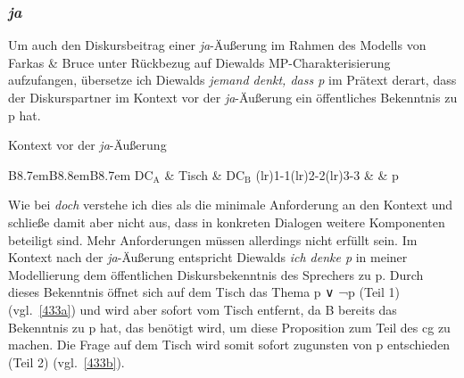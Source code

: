 \subsubsection{\textit{ja}}
\label{sec:ja}
Um auch den Diskursbeitrag einer \textit{ja}-Äußerung im Rahmen des Modells von Farkas \& Bruce unter Rückbezug auf Diewalds MP-Charakterisierung aufzufangen, übersetze ich Diewalds \textit{jemand denkt, dass p} im Prätext derart, dass der Diskurspartner im Kontext vor der \textit{ja}-Äußerung ein öffentliches Bekenntnis zu p hat.
\begin{exe}
	\ex\label{432} Kontext vor der \textit{ja}-Äußerung \\[-1em]	
 		\begin{tabular}[t]{B{8.7em}B{8.8em}B{8.7em}}
\lsptoprule 	
   		$\textrm{DC}_{\textrm{A}}$ & {Tisch} & $\textrm{DC}_{\textrm{B}}$ \tabularnewline\cmidrule(lr){1-1}\cmidrule(lr){2-2}\cmidrule(lr){3-3}
   		{} & {} & p \tabularnewline\midrule      
   		 \tabularnewline   
  		 \lspbottomrule
\end{tabular}
\end{exe}\largerpage[2]
Wie bei \textit{doch} verstehe ich dies als die minimale Anforderung an den Kontext und schließe damit aber nicht aus, dass in konkreten Dialogen weitere Komponenten beteiligt sind. Mehr Anforderungen müssen allerdings nicht erfüllt sein. Im Kontext nach der \textit{ja}-Äußerung entspricht Diewalds \textit{ich denke p} in meiner Mo\-dellierung dem öffentlichen Diskursbekenntnis des Sprechers zu p. Durch dieses Bekenntnis öffnet sich auf dem Tisch das Thema p ∨ ¬p (Teil 1) (vgl.\ \ref{433a}) und wird aber sofort vom Tisch entfernt, da B bereits das Bekenntnis zu p hat, das benötigt wird, um diese Proposition zum Teil des cg zu machen. Die Frage auf dem Tisch wird somit sofort zugunsten von p entschieden (Teil 2) (vgl.\ \ref{433b}).

